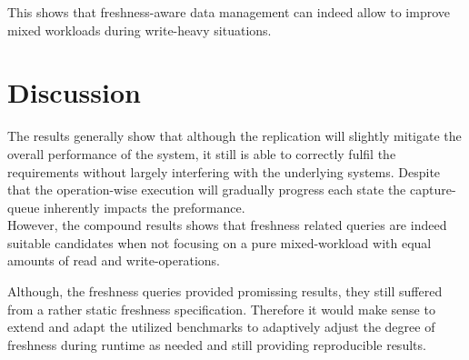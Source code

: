 This shows that freshness-aware data management can indeed allow to improve mixed workloads during write-heavy situations.









\section{Discussion}
\label{sec:discussion}

The results generally show that although the replication will slightly mitigate the overall performance of the system, it still is able to correctly fulfil the 
requirements without largely interfering with the underlying systems. 
Despite that the operation-wise execution will gradually progress each state the capture-queue inherently impacts the preformance.\\

However, the compound results shows that freshness related queries are indeed suitable candidates when not focusing on a pure mixed-workload with equal amounts of read and write-operations.

Although, the freshness queries provided promissing results, they still suffered from a rather static freshness specification. 
Therefore it would make sense to extend and adapt the utilized benchmarks to adaptively adjust the degree of freshness during runtime
as needed and still providing reproducible results.







